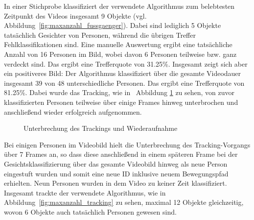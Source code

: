 \documentclass[a4paper, 11pt, twocolumn]{article}
\begin{document}
In einer Stichprobe klassifiziert der verwendete Algorithmus zum belebtesten Zeitpunkt des Videos insgesamt 9 Objekte (vgl. Abbildung~\ref{fig:maxanzahl_fussgaenger}). Dabei sind lediglich 5 Objekte tatsächlich Gesichter von Personen, während die übrigen Treffer Fehlklassifikationen sind. Eine manuelle Auswertung ergibt eine tatsächliche Anzahl von 16 Personen im Bild, wobei davon 6 Personen teilweise bzw. ganz verdeckt sind. Das ergibt eine Trefferquote von 31.25\%. Insgesamt zeigt sich aber ein positiveres Bild: Der Algorithmus klassifiziert über die gesamte Videodauer insgesamt 39 von 48 unterschiedliche Personen. Das ergibt eine Trefferquote von 81.25\%. Dabei wurde das Tracking, wie in ~Abbildung \ref{fig:unterbrechung_tracking} zu sehen, von zuvor klassifizierten Personen teilweise über einige Frames hinweg unterbrochen und anschließend wieder erfolgreich aufgenommen.

\begin{figure}[tb]
	\caption{Unterbrechung des Trackings und Wiederaufnahme}
	\label{fig:unterbrechung_tracking}
\end{figure}

Bei einigen Personen im Videobild hielt die Unterbrechung des Tracking-Vorgangs über 7 Frames an, so dass diese anschließend in einem späteren Frame bei der Gesichtsklassifizierung über das gesamte Videobild hinweg als neue Person eingestuft wurden und somit eine neue ID inklusive neuem Bewegungspfad erhielten. Neun Personen wurden in dem Video zu keiner Zeit klassifiziert. Insgesamt trackte der verwendete Algorithmus, wie in Abbildung~\ref{fig:maxanzahl_tracking} zu sehen, maximal 12 Objekte gleichzeitig, wovon 6 Objekte auch tatsächlich Personen gewesen sind.
\end{document}
